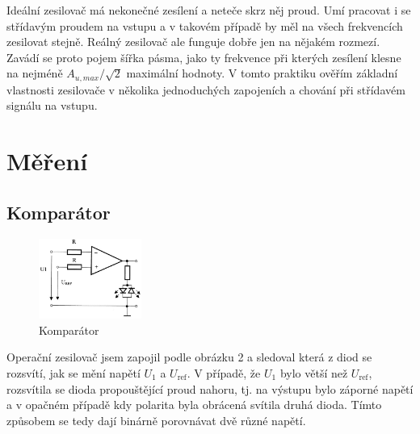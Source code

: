 \documentclass[a4paper,11pt]{article}
\begin{document}

Ideální zesilovač má nekonečné zesílení a neteče skrz něj proud. Umí pracovat i se střídavým proudem na vstupu a v takovém případě by měl na všech frekvencích zesilovat stejně. Reálný zesilovač ale funguje dobře jen na nějakém rozmezí. Zavádí se proto pojem šířka pásma, jako ty frekvence při kterých zesílení klesne na nejméně $ A_{u, max} / \sqrt{2}  $  maximální hodnoty. V tomto praktiku ověřím základní vlastnosti zesilovače v několika jednoduchých zapojeních a chování při střídavém signálu na vstupu.

\vspace{20pt}

\section{Měření}

\subsection{Komparátor}

\begin{figure}
    \vspace{-30pt}
    \centering
    \includegraphics[width=0.3\textwidth]{komparator.jpg}
    \caption{Komparátor}
\end{figure}

Operační zesilovač jsem zapojil podle obrázku 2 a sledoval která z diod se rozsvítí, jak se mění napětí $ U_1 $  a $ U_\text{ref} $. V případě, že $ U_1 $ bylo větší než $ U_{\text{ref}} $, rozsvítila se dioda propouštějící proud nahoru, tj. na výstupu bylo záporné napětí a v opačném případě kdy polarita byla obrácená svítila druhá dioda. Tímto způsobem se tedy dají binárně porovnávat dvě různé napětí.
\end{document}
